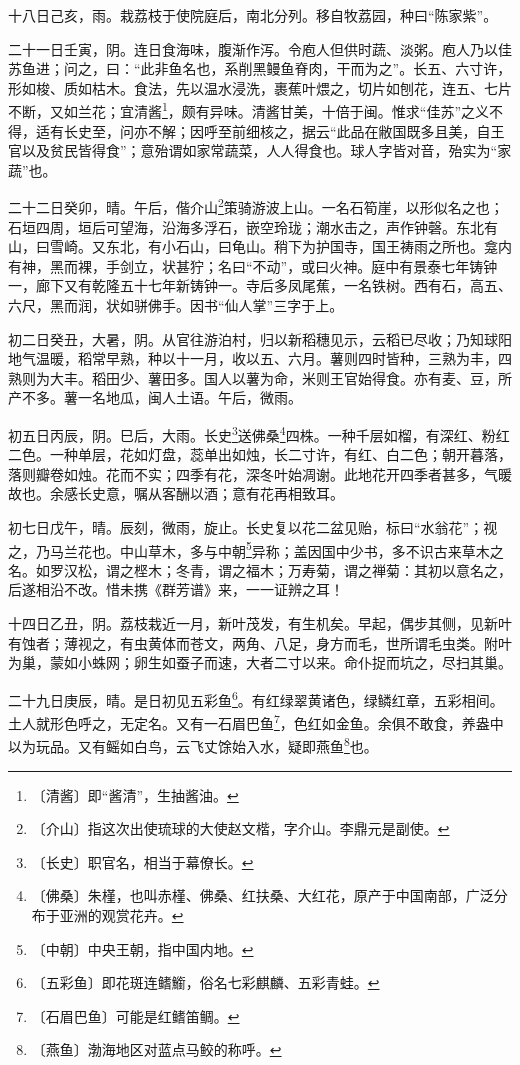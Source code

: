 \documentclass[12pt,UTF-8,openany]{ctexbook}
\begin{document}
\begin{normalsize}
    十八日己亥，雨。栽荔枝于使院庭后，南北分列。移自牧荔园，种曰“陈家紫”。
    
    二十一日壬寅，阴。连日食海味，腹渐作泻。令庖人但供时蔬、淡粥。庖人乃以佳苏鱼进；问之，曰：“此非鱼名也，系削黑鳗鱼脊肉，干而为之”。长五、六寸许，形如梭、质如枯木。食法，先以温水浸洗，裹蕉叶煨之，切片如刨花，连五、七片不断，又如兰花；宜清酱\footnote{〔清酱〕即“酱清”，生抽酱油。}，颇有异味。清酱甘美，十倍于闽。惟求“佳苏”之义不得，适有长史至，问亦不解；因呼至前细核之，据云“此品在敝国既多且美，自王官以及贫民皆得食”；意殆谓如家常蔬菜，人人得食也。球人字皆对音，殆实为“家蔬”也。
    
    二十二日癸卯，晴。午后，偕介山\footnote{〔介山〕指这次出使琉球的大使赵文楷，字介山。李鼎元是副使。}策骑游波上山。一名石筍崖，以形似名之也；石垣四周，垣后可望海，沿海多浮石，嵌空玲珑；潮水击之，声作钟磬。东北有山，曰雪崎。又东北，有小石山，曰龟山。稍下为护国寺，国王祷雨之所也。龛内有神，黑而裸，手剑立，状甚狞；名曰“不动”，或曰火神。庭中有景泰七年铸钟一，廊下又有乾隆五十七年新铸钟一。寺后多凤尾蕉，一名铁树。西有石，高五、六尺，黑而润，状如骈佛手。因书“仙人掌”三字于上。
    
    初二日癸丑，大暑，阴。从官往游泊村，归以新稻穗见示，云稻已尽收；乃知球阳地气温暖，稻常早熟，种以十一月，收以五、六月。薯则四时皆种，三熟为丰，四熟则为大丰。稻田少、薯田多。国人以薯为命，米则王官始得食。亦有麦、豆，所产不多。薯一名地瓜，闽人土语。午后，微雨。
    
    初五日丙辰，阴。巳后，大雨。长史\footnote{〔长史〕职官名，相当于幕僚长。}送佛桑\footnote{〔佛桑〕朱槿，也叫赤槿、佛桑、红扶桑、大红花，原产于中国南部，广泛分布于亚洲的观赏花卉。}四株。一种千层如榴，有深红、粉红二色。一种单层，花如灯盘，蕊单出如烛，长二寸许，有红、白二色；朝开暮落，落则瓣卷如烛。花而不实；四季有花，深冬叶始凋谢。此地花开四季者甚多，气暖故也。余感长史意，嘱从客酬以酒；意有花再相致耳。
    
    初七日戊午，晴。辰刻，微雨，旋止。长史复以花二盆见贻，标曰“水翁花”；视之，乃马兰花也。中山草木，多与中朝\footnote{〔中朝〕中央王朝，指中国内地。}异称；盖因国中少书，多不识古来草木之名。如罗汉松，谓之㭴木；冬青，谓之福木；万寿菊，谓之禅菊：其初以意名之，后遂相沿不改。惜未携《群芳谱》来，一一证辨之耳！
    
    十四日乙丑，阴。荔枝栽近一月，新叶茂发，有生机矣。早起，偶步其侧，见新叶有蚀者；薄视之，有虫黄体而苍文，两角、八足，身方而毛，世所谓毛虫类。附叶为巢，蒙如小蛛网；卵生如蚕子而速，大者二寸以来。命仆捉而坑之，尽扫其巢。
    
    二十九日庚辰，晴。是日初见五彩鱼\footnote{〔五彩鱼〕即花斑连鳍䲗，俗名七彩麒麟、五彩青蛙。}。有红绿翠黄诸色，绿鳞红章，五彩相间。土人就形色呼之，无定名。又有一石眉巴鱼\footnote{〔石眉巴鱼〕可能是红鳍笛鲷。}，色红如金鱼。余俱不敢食，养盎中以为玩品。又有鳐如白鸟，云飞丈馀始入水，疑即燕鱼\footnote{〔燕鱼〕渤海地区对蓝点马鲛的称呼。}也。
    

\end{normalsize}
\end{document}
